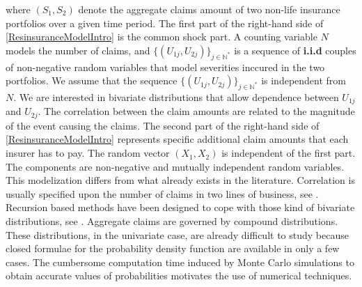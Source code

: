 where $(S_1, S_2)$ denote the aggregate claims amount of two non-life insurance portfolios over a given time period. The first part of the right-hand side of \eqref{ResinsuranceModelIntro} is the common shock part. A counting variable $N$ models the number of claims, and  $\{(U_{1j},U_{2j})\}_{j\in\mathbb{N}^{*}}$ is a sequence of \textbf{i.i.d} couples of non-negative random variables that model severities inccured in the two portfolios. We assume that the sequence $\{(U_{1j},U_{2j})\}_{j\in\mathbb{N}^{*}}$ is independent from $N$. We are interested in bivariate distributions that allow dependence between $U_{1j}$ and $U_{2j}$. The correlation between the claim amounts are related to the magnitude of the event causing the claims. The second part of the right-hand side of \eqref{ResinsuranceModelIntro} represents specific additional claim amounts that each insurer has to pay. The random vector $(X_{1},X_{2})$ is independent of the first part. The components are non-negative and mutually independent random variables. This modelization differs from what already exists in the literature. Correlation is usually specified upon the number of claims in two lines of business, see \citet{Am98,Am99}. Recursion based methods have been designed to cope with those kind of bivariate distributions, see \citet{Su99,Ve99}. Aggregate claims are governed by compound distributions. These distributions, in the univariate case, are already difficult to study because closed formulae for the probability density function are available in only a few cases. The cumbersome computation time induced by Monte Carlo simulations to obtain accurate values of probabilities motivates the use of numerical techniques.\\
